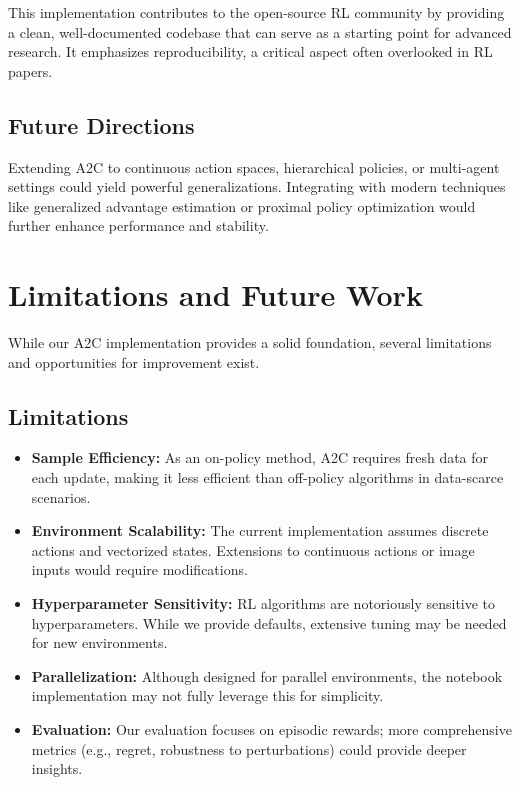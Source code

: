 \documentclass[11pt]{article}
\begin{document}
This implementation contributes to the open-source RL community by providing a clean, well-documented codebase that can serve as a starting point for advanced research. It emphasizes reproducibility, a critical aspect often overlooked in RL papers.

\subsection{Future Directions}
Extending A2C to continuous action spaces, hierarchical policies, or multi-agent settings could yield powerful generalizations. Integrating with modern techniques like generalized advantage estimation or proximal policy optimization would further enhance performance and stability.

\section{Limitations and Future Work}
While our A2C implementation provides a solid foundation, several limitations and opportunities for improvement exist.

\subsection{Limitations}
\begin{itemize}
  \item \textbf{Sample Efficiency:} As an on-policy method, A2C requires fresh data for each update, making it less efficient than off-policy algorithms in data-scarce scenarios.
  \item \textbf{Environment Scalability:} The current implementation assumes discrete actions and vectorized states. Extensions to continuous actions or image inputs would require modifications.
  \item \textbf{Hyperparameter Sensitivity:} RL algorithms are notoriously sensitive to hyperparameters. While we provide defaults, extensive tuning may be needed for new environments.
  \item \textbf{Parallelization:} Although designed for parallel environments, the notebook implementation may not fully leverage this for simplicity.
  \item \textbf{Evaluation:} Our evaluation focuses on episodic rewards; more comprehensive metrics (e.g., regret, robustness to perturbations) could provide deeper insights.
\end{itemize}
\end{document}
